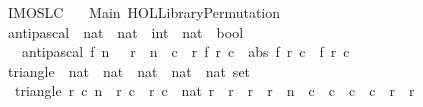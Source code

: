 %
\begin{isabellebody}%
%
%
\isadelimdocument
%
\endisadelimdocument
%
\isatagdocument
%
\isamarkuptrue%
%
\endisatagdocument
{\isafolddocument}%
%
\isadelimdocument
%
\endisadelimdocument
%
\isadelimtheory
%
\endisadelimtheory
%
\isatagtheory
{}\isamarkupfalse%
\ IMO{\isacharunderscore}{}{}{}{}{\isacharunderscore}SL{\isacharunderscore}C{}\isanewline
\ \ \ Main\ {\isachardoublequoteopen}HOL{\isacharminus}Library{\isachardot}Permutation{\isachardoublequoteclose}\isanewline
{}%
\endisatagtheory
{\isafoldtheory}%
%
\isadelimtheory
\isanewline
%
\endisadelimtheory
\isanewline
{}\isamarkupfalse%
\ antipascal\ {\isacharcolon}{\isacharcolon}\ {\isachardoublequoteopen}{\isacharparenleft}nat\ {\isasymRightarrow}\ nat\ {\isasymRightarrow}\ int{\isacharparenright}\ {\isasymRightarrow}\ nat\ {\isasymRightarrow}\ bool{\isachardoublequoteclose}\ \isanewline
\ \ \ {\isachardoublequoteopen}antipascal\ f\ n\ {\isasymlongleftrightarrow}\ {\isacharparenleft}{\isasymforall}\ r\ {\isacharless}\ n{\isachardot}\ {\isasymforall}\ c\ {\isasymle}\ r{\isachardot}\ f\ r\ c\ {\isacharequal}\ abs\ {\isacharparenleft}f\ {\isacharparenleft}r{\isacharplus}{}{\isacharparenright}\ c\ {\isacharminus}\ f\ {\isacharparenleft}r{\isacharplus}{}{\isacharparenright}\ {\isacharparenleft}c{\isacharplus}{}{\isacharparenright}{\isacharparenright}{\isacharparenright}{\isachardoublequoteclose}\isanewline
\isanewline
{}\isamarkupfalse%
\ triangle\ {\isacharcolon}{\isacharcolon}\ {\isachardoublequoteopen}nat\ {\isasymRightarrow}\ nat\ {\isasymRightarrow}\ nat\ {\isasymRightarrow}\ {\isacharparenleft}nat\ {\isasymtimes}\ nat{\isacharparenright}\ set{\isachardoublequoteclose}\ \isanewline
\ \ {\isachardoublequoteopen}triangle\ r{}\ c{}\ n\ {\isacharequal}\ {\isacharbraceleft}{\isacharparenleft}r{\isacharcomma}\ c{\isacharparenright}\ {\isacharbar}\ r\ c\ {\isacharcolon}{\isacharcolon}\ nat{\isachardot}\ r{}\ {\isasymle}\ r\ {\isasymand}\ r\ {\isacharless}\ r{}\ {\isacharplus}\ n\ {\isasymand}\ c{}\ {\isasymle}\ c\ {\isasymand}\ c\ {\isasymle}\ c{}\ {\isacharplus}\ r\ {\isacharminus}\ r{}{\isacharbraceright}{\isachardoublequoteclose}\isanewline

\end{isabellebody}
